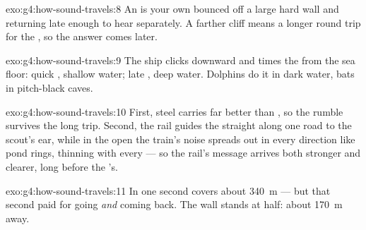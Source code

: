 \begin{solution}{exo:g4:how-sound-travels:8}
An  is your own  bounced off a large hard wall and
returning late enough to hear separately. A farther cliff means a
longer round trip for the , so the answer comes later.
\end{solution}

\begin{solution}{exo:g4:how-sound-travels:9}
The ship clicks downward and times the  from the sea floor:
quick , shallow water; late , deep water. Dolphins do it in
dark water, bats in pitch-black caves.
\end{solution}

\begin{solution}{exo:g4:how-sound-travels:10}
First, steel carries  far better than , so the rumble
survives the long trip. Second, the rail guides the  straight
along one road to the scout's ear, while in the open  the
train's noise spreads out in every direction like pond rings,
thinning with every  --- so the rail's message arrives both
stronger and clearer, long before the 's.
\end{solution}

\begin{solution}{exo:g4:how-sound-travels:11}
In one second  covers about \qty{340}{m} --- but that second
paid for going \emph{and} coming back. The wall stands at half:
about \qty{170}{m} away.
\end{solution}
